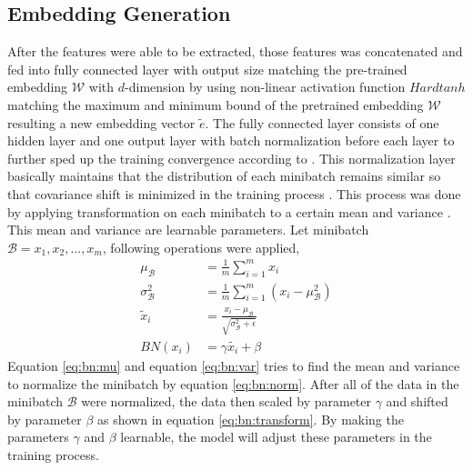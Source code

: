     \subsection{Embedding Generation}
        After the features were able to be extracted, those features
        was concatenated and fed into fully connected layer with
        output size matching the pre-trained embedding $\mathcal{W}$
        with $d$-dimension by using non-linear activation function
        $Hardtanh$ matching the maximum and minimum bound of the
        pretrained embedding $\mathcal{W}$ resulting a new embedding
        vector $\tilde{e}$. The fully connected layer consists of one
        hidden layer and one output layer with batch normalization
        before each layer to further sped up the training convergence
        according to \cite{batchnorm:DBLP:journals/corr/IoffeS15}.
        This normalization layer basically maintains that the
        distribution of each minibatch remains similar so that
        covariance shift is minimized in the training process
        \citep{batchnorm:DBLP:journals/corr/IoffeS15}. This process
        was done by applying transformation on each minibatch to a
        certain mean and variance
        \citep{batchnorm:DBLP:journals/corr/IoffeS15}. This mean and
        variance are learnable parameters. Let minibatch $\mathcal{B}
        = {x_1, x_2, \dots, x_m}$, following operations were applied,
        \begin{align}
            \label{eq:bn:mu}
            \mu_{\mathcal{B}} &= \frac{1}{m} \sum_{i=1}^m x_i\\
            \label{eq:bn:var}
            \sigma^2_{\mathcal{B}} &= \frac{1}{m} \sum_{i=1}^m \left(x_i - \mu_{\mathcal{B}}^2\right)\\
            \label{eq:bn:norm}            
            \tilde{x}_i &= \frac{x_i - \mu_{\mathcal{B}}}{\sqrt{\sigma^2_{\mathcal{B}} + \epsilon}}\\
            \label{eq:bn:transform}            
            BN(x_i) &= \gamma\tilde{x_i} + \beta
        \end{align}
        Equation \ref{eq:bn:mu} and equation \ref{eq:bn:var} tries to
        find the mean and variance to normalize the minibatch by
        equation \ref{eq:bn:norm}. After all of the data in the
        minibatch $\mathcal{B}$ were normalized, the data then scaled
        by parameter $\gamma$ and shifted by parameter $\beta$ as
        shown in equation \ref{eq:bn:transform}. By making the
        parameters $\gamma$ and $\beta$ learnable, the model will
        adjust these parameters in the training process.

